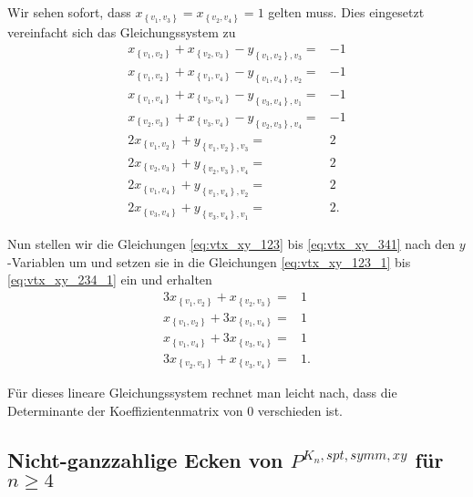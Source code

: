 \documentclass[10p,a4paper,BCOR = 12mm, DIV=15]{scrbook}
\begin{document}
\begin{bew}
Wir sehen sofort, dass $x_{\left\{v_1, v_3\right\}} = x_{\left\{v_2, v_4\right\}}  = 1$ gelten muss. Dies eingesetzt vereinfacht sich das Gleichungssystem zu
{
\allowdisplaybreaks
\begin{align}
x_{\left\{v_1, v_2\right\}} + x_{\left\{v_2, v_3\right\}} - y_{\left\{v_1, v_2\right\}, v_3}
 = & -1 \label{eq:vtx_xy_123_1} \\
x_{\left\{v_1, v_2\right\}} + x_{\left\{v_1, v_4\right\}}
 - y_{\left\{v_1, v_4\right\}, v_2}
 = & -1 \\
x_{\left\{v_1, v_4\right\}} + x_{\left\{v_3, v_4\right\}}
 - y_{\left\{v_3, v_4\right\}, v_1} = & -1 \\
x_{\left\{v_2, v_3\right\}} + x_{\left\{v_3, v_4\right\}} - y_{\left\{v_2, v_3\right\}, v_4}
 = & -1 \label{eq:vtx_xy_234_1} \\
2 x_{\left\{v_1, v_2\right\}} + y_{\left\{v_1, v_2\right\}, v_3} 
 = & 2 \label{eq:vtx_xy_123} \\
2 x_{\left\{v_2, v_3\right\}}
 + y_{\left\{v_2, v_3\right\}, v_4} = & 2 \\
2 x_{\left\{v_1, v_4\right\}} + y_{\left\{v_1, v_4\right\}, v_2}
 = & 2 \\
2 x_{\left\{v_3, v_4\right\}} + y_{\left\{v_3, v_4\right\}, v_1}
 = & 2. \label{eq:vtx_xy_341}
\end{align}
}

Nun stellen wir die Gleichungen \eqref{eq:vtx_xy_123} bis \eqref{eq:vtx_xy_341} nach den $y$-Variablen um und setzen sie in die Gleichungen \eqref{eq:vtx_xy_123_1} bis \eqref{eq:vtx_xy_234_1} ein und erhalten
{
\allowdisplaybreaks
\begin{align*}
3 x_{\left\{v_1, v_2\right\}} + x_{\left\{v_2, v_3\right\}} = & 1 \\
x_{\left\{v_1, v_2\right\}} + 3 x_{\left\{v_1, v_4\right\}} = & 1 \\
x_{\left\{v_1, v_4\right\}} + 3 x_{\left\{v_3, v_4\right\}} = & 1 \\
3 x_{\left\{v_2, v_3\right\}} + x_{\left\{v_3, v_4\right\}} = & 1.
\end{align*}
}

Für dieses lineare Gleichungssystem rechnet man leicht nach, dass die Determinante der Koeffizientenmatrix von $0$ verschieden ist.
\end{bew}

\subsection{Nicht-ganzzahlige Ecken von $P^{K_n, spt, symm, xy}$ für $n \geq 4$}
\end{document}
